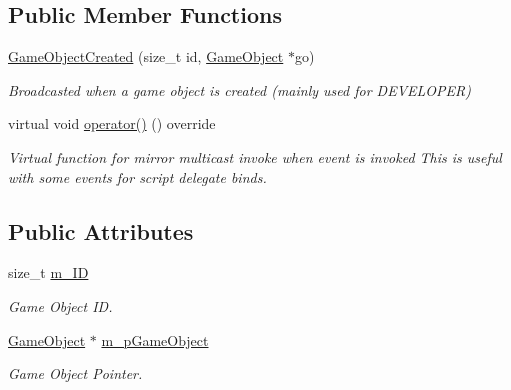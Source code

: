 \subsection*{Public Member Functions}
\begin{DoxyCompactItemize}
\item 
\hyperlink{classGameObjectCreated_a5e37116ddb39c924a0cda3b8e01ecb31}{Game\+Object\+Created} (size\+\_\+t id, \hyperlink{classGameObject}{Game\+Object} $\ast$go)
\begin{DoxyCompactList}\small\item\em Broadcasted when a game object is created (mainly used for D\+E\+V\+E\+L\+O\+P\+ER) \end{DoxyCompactList}\item 
\mbox{\label{classGameObjectCreated_abfa8b31d8ca68fbb6c713a683d0b409f}} 
virtual void \hyperlink{classGameObjectCreated_abfa8b31d8ca68fbb6c713a683d0b409f}{operator()} () override
\begin{DoxyCompactList}\small\item\em Virtual function for mirror multicast invoke when event is invoked This is useful with some events for script delegate binds. \end{DoxyCompactList}\end{DoxyCompactItemize}
\subsection*{Public Attributes}
\begin{DoxyCompactItemize}
\item 
\mbox{\label{classGameObjectCreated_af7e7411fe057d331cb9b5b2b8e80b0dc}} 
size\+\_\+t \hyperlink{classGameObjectCreated_af7e7411fe057d331cb9b5b2b8e80b0dc}{m\+\_\+\+ID}
\begin{DoxyCompactList}\small\item\em Game Object ID. \end{DoxyCompactList}\item 
\mbox{\label{classGameObjectCreated_af6e6abdf7dbf59f407b4ccb24d8d1333}} 
\hyperlink{classGameObject}{Game\+Object} $\ast$ \hyperlink{classGameObjectCreated_af6e6abdf7dbf59f407b4ccb24d8d1333}{m\+\_\+p\+Game\+Object}
\begin{DoxyCompactList}\small\item\em Game Object Pointer. \end{DoxyCompactList}\end{DoxyCompactItemize}

